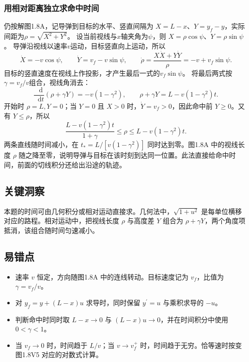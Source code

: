 \documentclass[UTF8,fontset=fandol,a4paper,11pt]{ctexart}
\newcommand{\dd}{\mathop{}\!\mathrm{d}}
\begin{document}
\subsubsection*{用相对距离独立求命中时间}
仍按解图1.8A，记导弹到目标的水平、竖直间隔为
$X=L-x$、$Y=y_f-y$，实际间距为$\rho=\sqrt{X^2+Y^2}$。
设当前视线与$x$轴夹角为$\psi$，则
$X=\rho\cos\psi$、$Y=\rho\sin\psi$。
导弹沿视线以速率$v$运动，目标竖直向上运动，所以
\[
\dot X=-v\cos\psi,\qquad
\dot Y=v_f-v\sin\psi,\qquad
\dot\rho=\frac{X\dot X+Y\dot Y}{\rho}
=-v+v_f\sin\psi.
\]
目标的竖直速度在视线上作投影，才产生最后一式的$v_f\sin\psi$。
将最后两式按$\gamma=v_f/v$组合，视线角消去：
\[
\frac{\dd}{\dd t}(\rho+\gamma Y)
=-v(1-\gamma^2),\qquad
\rho+\gamma Y=L-v(1-\gamma^2)t.
\]
开始时 $\rho=L,Y=0$；当 $Y=0$ 且 $X>0$ 时，$\dot Y=v_f>0$，因此命中前 $Y\geq0$。又有 $Y\leq\rho$，所以
\[
\frac{L-v(1-\gamma^2)t}{1+\gamma}\leq\rho\leq L-v(1-\gamma^2)t.
\]
两条直线随时间减小，在 $t_*=L/[v(1-\gamma^2)]$ 同时达到零。图1.8A 中的视线长度 $\rho$ 随之降至零，说明导弹与目标在该时刻到达同一位置。此法直接给命中时间，前面的切线积分还给出沿途的轨迹。




\subsection*{关键洞察}

本题的时间可由几何积分或相对运动直接求。几何法中，$\sqrt{1+u^2}$ 是每单位横移对应的路程。相对运动中，把视线长度 $\rho$ 与高度差 $Y$ 组合为 $\rho+\gamma Y$，两个角度项抵消，该组合随时间匀速减小。



\subsection*{易错点}

\begin{itemize}
\item 速率 $v$ 恒定，方向随图1.8A 中的连线转动。目标速度记为 $v_f$，比值为 $\gamma=v_f/v$。
\item 对 $y_f=y+(L-x)u$ 求导时，同时保留 $y^{\prime}=u$ 与乘积求导的 $-u$。
\item 判断命中时同时取 $L-x\to0$ 与 $(L-x)u\to0$，并在时间积分中使用 $0<\gamma<1$。
\item 当 $v_f\to0$ 时，时间趋于 $L/v$；当 $v\to v_f^+$ 时，时间趋于无穷。恰等速时按变图1.8V5 对应的对数式计算。
\end{itemize}
\end{document}
